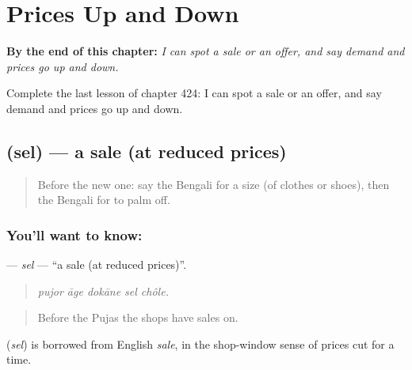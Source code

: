 
\chapter{Prices Up and Down}
\label{ch:bn-prices-up-and-down}

\begin{chapteropening}
\textbf{By the end of this chapter:} \emph{I can spot a sale or an offer, and say demand and prices go up and down.}

Complete the last lesson of chapter 424: I can spot a sale or an offer, and say demand and prices go up and down.
\end{chapteropening}

\section[\texorpdfstring{\bn{সেল} (sel)}{সেল (sel)}]{ (sel) — a sale (at reduced prices)}

\label{lesson:BN-C424-sel}



\begin{quote}
Before the new one: say the Bengali for a size (of clothes or shoes), then the Bengali for to palm off.
\end{quote}

\subsection*{You'll want to know: }
\textbf{} — \emph{sel} — \textquotedblleft{}a sale (at reduced prices)\textquotedblright{}.

\begin{quote}
    
\end{quote}

\begin{quote}
\emph{pujor āge dokāne sel chôle.}
\end{quote}

\begin{quote}
Before the Pujas the shops have sales on.
\end{quote}

\begin{cousinweb}
\textbf{} (\emph{sel}) is borrowed from English \emph{sale}, in the shop-window sense of prices cut for a time.
\end{cousinweb}

